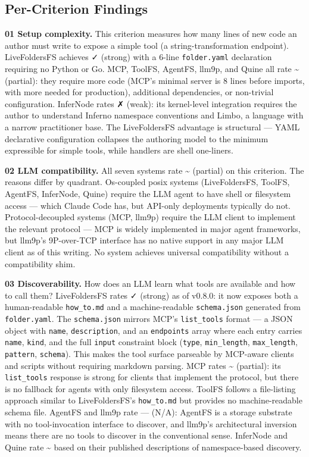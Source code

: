 \documentclass[
  11pt,
]{article}
\begin{document}
\hypertarget{per-criterion-findings}{%
\subsection{Per-Criterion Findings}\label{per-criterion-findings}}

\textbf{01 Setup complexity.} This criterion measures how many lines of
new code an author must write to expose a simple tool (a
string-transformation endpoint). LiveFoldersFS achieves ✓ (strong) with
a 6-line \texttt{folder.yaml} declaration requiring no Python or Go.
MCP, ToolFS, AgentFS, llm9p, and Quine all rate \textasciitilde{}
(partial): they require more code (MCP's minimal server is 8 lines
before imports, with more needed for production), additional
dependencies, or non-trivial configuration. InferNode rates ✗ (weak):
its kernel-level integration requires the author to understand Inferno
namespace conventions and Limbo, a language with a narrow practitioner
base. The LiveFoldersFS advantage is structural --- YAML declarative
configuration collapses the authoring model to the minimum expressible
for simple tools, while handlers are shell one-liners.

\textbf{02 LLM compatibility.} All seven systems rate \textasciitilde{}
(partial) on this criterion. The reasons differ by quadrant. Os-coupled
posix systems (LiveFoldersFS, ToolFS, AgentFS, InferNode, Quine) require
the LLM agent to have shell or filesystem access --- which Claude Code
has, but API-only deployments typically do not. Protocol-decoupled
systems (MCP, llm9p) require the LLM client to implement the relevant
protocol --- MCP is widely implemented in major agent frameworks, but
llm9p's 9P-over-TCP interface has no native support in any major LLM
client as of this writing. No system achieves universal compatibility
without a compatibility shim.

\textbf{03 Discoverability.} How does an LLM learn what tools are
available and how to call them? LiveFoldersFS rates ✓ (strong) as of
v0.8.0: it now exposes both a human-readable \texttt{how\_to.md} and a
machine-readable \texttt{schema.json} generated from
\texttt{folder.yaml}. The \texttt{schema.json} mirrors MCP's
\texttt{list\_tools} format --- a JSON object with \texttt{name},
\texttt{description}, and an \texttt{endpoints} array where each entry
carries \texttt{name}, \texttt{kind}, and the full \texttt{input}
constraint block (\texttt{type}, \texttt{min\_length},
\texttt{max\_length}, \texttt{pattern}, \texttt{schema}). This makes the
tool surface parseable by MCP-aware clients and scripts without
requiring markdown parsing. MCP rates \textasciitilde{} (partial): its
\texttt{list\_tools} response is strong for clients that implement the
protocol, but there is no fallback for agents with only filesystem
access. ToolFS follows a file-listing approach similar to
LiveFoldersFS's \texttt{how\_to.md} but provides no machine-readable
schema file. AgentFS and llm9p rate --- (N/A): AgentFS is a storage
substrate with no tool-invocation interface to discover, and llm9p's
architectural inversion means there are no tools to discover in the
conventional sense. InferNode and Quine rate \textasciitilde{} based on
their published descriptions of namespace-based discovery.
\end{document}
